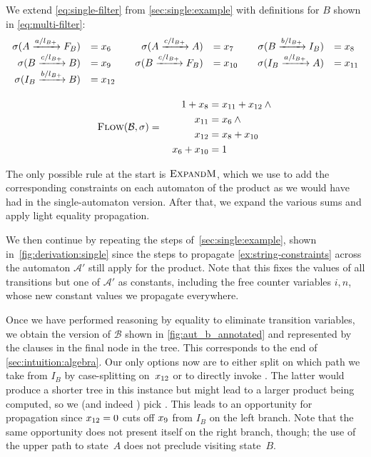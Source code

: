 We extend \cref{eq:single-filter} from \cref{sec:single:example} with
definitions for $B$ shown in \cref{eq:multi-filter}:
\begin{equation}\label{eq:multi-filter}
  \begin{array}{rl@{\qquad}rl@{\qquad}rl}
     \Filter(\FromLabelTo{A}{a / l_{B+}}{F_B} ) &= \TransitionVar_6 
     &
     \Filter(\FromLabelTo{A}{c / l_{B+}}{A} ) &= \TransitionVar_7 
     &
      \Filter(\FromLabelTo{B}{b / l_{B+}}{I_B}) &= \TransitionVar_8 
     \\
     \Filter(\FromLabelTo{B}{c / l_{B+}}{B}) &= \TransitionVar_9 
     &
     \Filter(\FromLabelTo{B}{c / l_{B+}}{F_B}) &= \TransitionVar_{10}
     &
     \Filter(\FromLabelTo{I_B}{a / l_{B+}}{A}) &= \TransitionVar_{11}
     \\
      \Filter(\FromLabelTo{I_B}{b / l_{B+}}{B}) &= \TransitionVar_{12}
    \\[3ex]
% 
    \multicolumn{6}{c}{
        \FlowEq(\mathcal{B}, \Filter) =\quad  \begin{aligned}
            1 + \TransitionVar_{8}   &= \TransitionVar_{11} + \TransitionVar_{12} \wedge\mbox{}\\
            \TransitionVar_{11} &= \TransitionVar_6\wedge\mbox{}\\
            \TransitionVar_{12} &= \TransitionVar_8 + \TransitionVar_{10}\mbox{}\\
            \TransitionVar_6 + \TransitionVar_{10} &= 1
        \end{aligned}}
  \end{array}
\end{equation}

The only possible rule at the start is $\textsc{ExpandM}$, which we use to add the
corresponding constraints on each automaton of the product as we would have had
in the single-automaton version. After that, we expand the various sums and apply
light equality propagation.

We then continue by repeating the steps of~\cref{sec:single:example}, shown 
in~\cref{fig:derivation:single} since the steps to propagate
\cref{ex:string-constraints} across the automaton $\mathcal{A}'$ still apply for the
product. Note that this fixes the values of all transitions but one of $\mathcal{A}'$ as
constants, including the free counter variables $i, n$, whose new constant
values we propagate everywhere.

Once we have performed reasoning by equality to eliminate transition variables,
we obtain the version of $\mathcal{B}$ shown in \cref{fig:aut_b_annotated} and represented
by the clauses in the final node in the tree. This corresponds to the end of
\cref{sec:intuition:algebra}. Our only options now are to either split on which
path we take from $I_B$ by case-splitting on~$x_{12}$ or to
directly invoke \Materialise{}. The latter would produce a shorter tree in this
instance but might lead to a larger product being computed, so we (and indeed
\Catra{}) pick \Split{}. This leads to an opportunity for propagation since
$x_{12} = 0$ cuts off $x_{9}$ from $I_B$ on the left
branch. Note that the same opportunity does not present itself on the right
branch, though; the use of the upper path to state~$A$ does not preclude visiting
state~$B$.

